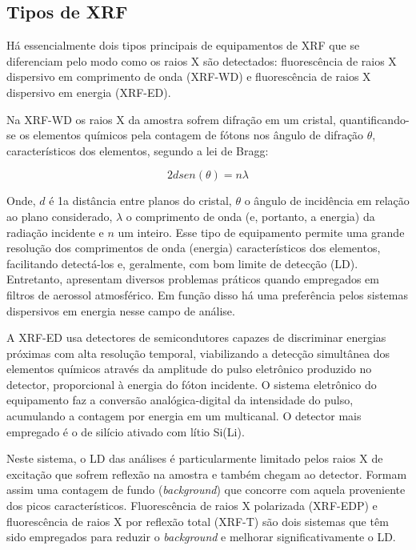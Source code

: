 \subsection{Tipos de XRF}

Há essencialmente dois tipos principais de equipamentos de XRF que se 
diferenciam pelo modo como os raios X são detectados: fluorescência de raios 
X dispersivo em comprimento de onda (XRF-WD) e fluorescência de raios X 
dispersivo em energia (XRF-ED).

Na XRF-WD os raios X da amostra sofrem difração em um cristal, quantificando-se
os elementos químicos pela contagem de fótons nos ângulo de difração $\theta$, 
característicos dos elementos, segundo a lei de Bragg:

\begin{equation}
	\label{eq:bragg}
	2d sen(\theta) = n \lambda
\end{equation}

Onde, $d$ é 1a distância entre planos do cristal, $\theta$ o ângulo de incidência 
em relação ao plano considerado, $\lambda$ o comprimento de onda 
(e, portanto, a energia) da radiação incidente e $n$ um inteiro.
Esse tipo de equipamento permite uma grande resolução dos comprimentos de onda 
(energia) característicos dos elementos, facilitando detectá-los e, geralmente, 
com bom limite de detecção (LD).
Entretanto, apresentam diversos problemas práticos quando empregados em filtros 
de aerossol atmosférico. Em função disso há uma preferência pelos sistemas 
dispersivos em energia nesse campo de análise. 

A XRF-ED usa detectores de semicondutores capazes de discriminar energias 
próximas com alta resolução temporal, viabilizando a detecção simultânea dos 
elementos químicos através da amplitude do pulso eletrônico produzido no 
detector, proporcional à energia do fóton incidente. O sistema eletrônico do 
equipamento faz a conversão analógica-digital da intensidade do pulso, 
acumulando a contagem por energia em um multicanal. O detector mais empregado é 
o de silício ativado com lítio Si(Li). 

Neste sistema, o LD das análises é particularmente limitado pelos raios X de 
excitação que sofrem reflexão na amostra e também chegam ao detector. 
Formam assim uma contagem de fundo (\textit{background}) que concorre com 
aquela proveniente dos picos característicos. 
Fluorescência de raios X polarizada (XRF-EDP) e fluorescência de raios X por 
reflexão total (XRF-T) são dois sistemas que têm sido empregados 
para reduzir o \textit{background} e melhorar significativamente o LD.

